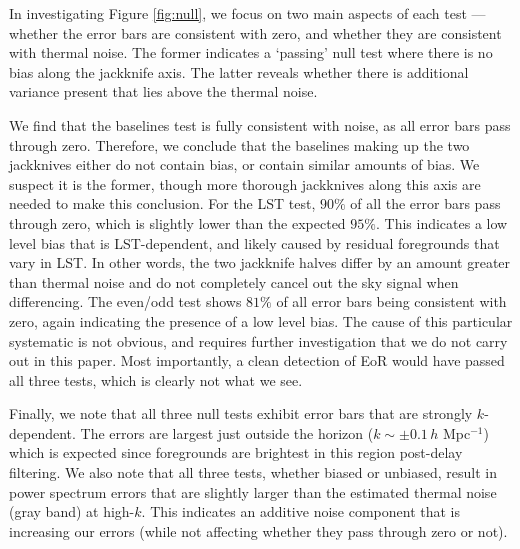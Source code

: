 \documentclass[preprint2,numberedappendix,tighten]{aastex6}
\begin{document}

In investigating Figure \ref{fig:null}, we focus on two main aspects of each test --- whether the error bars are consistent with zero, and whether they are consistent with thermal noise. The former indicates a `passing' null test where there is no bias along the jackknife axis. The latter reveals whether there is additional variance present that lies above the thermal noise.

We find that the baselines test is fully consistent with noise, as all error bars pass through zero. Therefore, we conclude that the baselines making up the two jackknives either do not contain bias, or contain similar amounts of bias. We suspect it is the former, though more thorough jackknives along this axis are needed to make this conclusion. For the LST test, $90\%$ of all the error bars pass through zero, which is slightly lower than the expected $95\%$. This indicates a low level bias that is LST-dependent, and likely caused by residual foregrounds that vary in LST. In other words, the two jackknife halves differ by an amount greater than thermal noise and do not completely cancel out the sky signal when differencing. The even/odd test shows $81\%$ of all error bars being consistent with zero, again indicating the presence of a low level bias. The cause of this particular systematic is not obvious, and requires further investigation that we do not carry out in this paper. Most importantly, a clean detection of EoR would have passed all three tests, which is clearly not what we see. 

Finally, we note that all three null tests exhibit error bars that are strongly $k$-dependent. The errors are largest just outside the horizon ($k\sim\pm 0.1$\,$h$ Mpc$^{-1}$) which is expected since foregrounds are brightest in this region post-delay filtering. We also note that all three tests, whether biased or unbiased, result in power spectrum errors that are slightly larger than the estimated thermal noise (gray band) at high-$k$. This indicates an additive noise component that is increasing our errors (while not affecting whether they pass through zero or not). 
\end{document}
